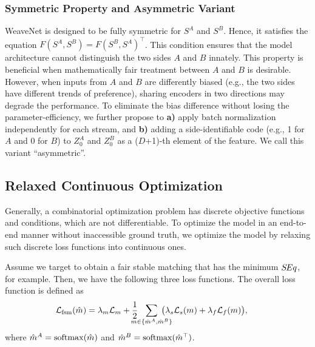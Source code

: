 \subsubsection{Symmetric Property and Asymmetric Variant}
WeaveNet is designed to be fully symmetric for $S^A$ and $S^B$. Hence, it satisfies the equation $F(S^A, S^B)=F(S^B, S^A)^\top$.
This condition ensures that the model architecture cannot distinguish the two sides $A$ and $B$ innately. 
This property is beneficial when mathematically fair treatment between $A$ and $B$ is desirable. 
However, when inputs from $A$ and $B$ are differently biased (e.g., the two sides have different trends of preference), sharing encoders in two directions may degrade the performance.
To eliminate the bias difference without losing the parameter-efficiency, we further propose to \textbf{a)} apply batch normalization independently for each stream, and \textbf{b)} adding a side-identifiable code (e.g., 1 for $A$ and 0 for $B$) to $Z^A_0$ and $Z^B_0$ as a ($D$+1)-th element of the feature. We call this variant ``asymmetric''.


\subsection{Relaxed Continuous Optimization}\label{ss:relaxation}
Generally, a combinatorial optimization problem has discrete objective functions and conditions, which are not differentiable. To optimize the model in an end-to-end manner without inaccessible ground truth, we optimize the model by relaxing such discrete loss functions into continuous ones. 

Assume we target to obtain a fair stable matching that has the minimum $S\hspace{-0.1em}Eq$, for example. Then, we have the following three loss functions.
The overall loss function is defined as
\begin{align}
\hspace{-0.5em}    \loss_{\rm fsm}(\hat{m})&= \lambda_m\loss_m + \frac{1}{2}\hspace{-1.0em}\sum_{m\in \{\hat{m}^A,\hat{m}^B\}}\hspace{-1.3em}\bigl( \lambda_s\loss_s(m) + \lambda_f\loss_{f}(m)\bigr), \label{eq:lfsm}
\end{align}
where $\hat{m}^A = {\rm softmax}(\hat{m})$ and $\hat{m}^B = {\rm softmax}(\hat{m}^{\top})$. 

